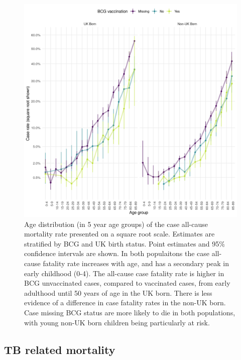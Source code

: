 \documentclass[11pt,twoside]{bristolthesis}
\begin{document}
  \begin{figure}
  
  {\centering \includegraphics[width=0.8\linewidth,]{chapters/tb-epi-england/figures/plot-all-mort-age-dist} 
  
  }
  
  \caption[Age distribution (in 5 year age groups) of the case all-cause mortality rate presented on a square root scale.]{Age distribution (in 5 year age groups) of the case all-cause mortality rate presented on a square root scale. Estimates are stratified by BCG and UK birth status. Point estimates and 95\%  confidence intervals are shown. In both populaitons the case all-cause fatality rate increases with age, and has a secondary peak in early childhood (0-4). The all-cause case fatality rate is higher in BCG unvaccinated cases, compared to vaccinated cases, from early adulthood until 50 years of age in the UK born. There is less evidence of a difference in case fatality rates in the non-UK born. Case missing BCG status are more likely to die in both populations, with young non-UK born children being particularly at risk.}\label{fig:plot-all-mort-age-dist}
  \end{figure}
  \hypertarget{tb-related-mortality}{%
  \subsection{TB related mortality}\label{tb-related-mortality}}
  
\end{document}
